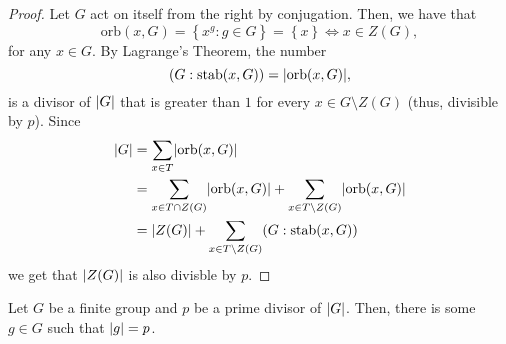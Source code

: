\begin{proof}
  Let \(G\) act on itself from the right by conjugation. Then, we have that
  \[
    \text{orb}(x,G)
    =
    \left\{x^{g}:g\in{G}\right\}
    =
    \left\{x\right\}
    \iff
    x\in{Z(G)},
  \]
  for any \(x\in{G}\). By Lagrange's Theorem, the number
  \[
    (G:\text{stab}(x,G))
    =
    \lvert\text{orb}(x,G)\rvert,
  \]
  is a divisor of \(\lvert G\rvert\) that is greater than \(1\) for every
  \({x}\in{G\setminus{Z(G)}}\) (thus, divisible by \(p\)). Since
  \begin{align*}
    \lvert G\rvert
    &=
    \sum_{x\in{T}}\lvert\text{orb}(x,G)\rvert
    \\
    &=
    \sum_{x\in{T\cap{Z(G)}}}\lvert\text{orb}(x,G)\rvert
    +
    \sum_{x\in{T\setminus{Z(G)}}}\lvert\text{orb}(x,G)\rvert
    \\
    &=
    \lvert Z(G)\rvert
    +
    \sum_{x\in{T\setminus{Z(G)}}}(G:\text{stab}(x,G))
  \end{align*}
  we get that \(\lvert Z(G)\rvert\) is also divisble by \(p\).
\end{proof}

\begin{theorem}[Cauchy]\label{thm:cauchys-theorem}
  Let \(G\) be a finite group and \(p\) be a prime divisor of \(\lvert G\rvert\).
  Then, there is some \(g\in{G}\) such that \(\lvert g\rvert=p\).
\end{theorem}

